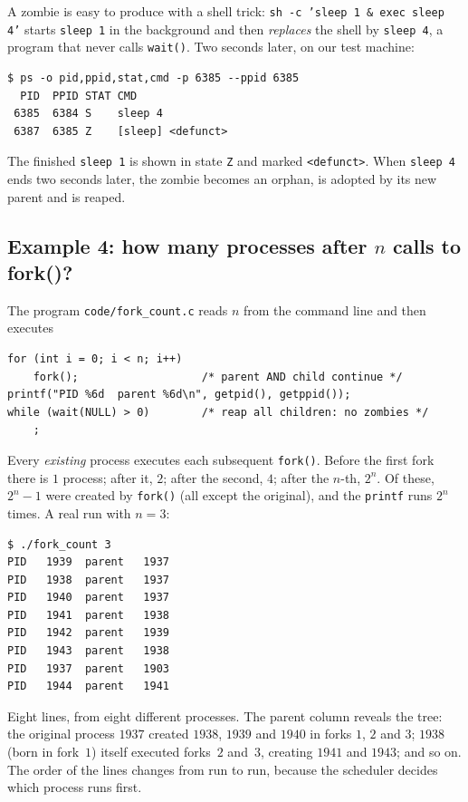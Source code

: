 \documentclass[11pt,a4paper]{article}
\newcommand{\cmd}[1]{\texttt{#1}}
\begin{document}
A zombie is easy to produce with a shell trick: \cmd{sh -c 'sleep 1 \& exec sleep 4'} starts \cmd{sleep 1} in the background and then \emph{replaces} the shell by \cmd{sleep 4}, a program that never calls \cmd{wait()}. Two seconds later, on our test machine:

\begin{lstlisting}[style=term]
$ ps -o pid,ppid,stat,cmd -p 6385 --ppid 6385
  PID  PPID STAT CMD
 6385  6384 S    sleep 4
 6387  6385 Z    [sleep] <defunct>
\end{lstlisting}

The finished \cmd{sleep 1} is shown in state \texttt{Z} and marked \texttt{<defunct>}. When \cmd{sleep 4} ends two seconds later, the zombie becomes an orphan, is adopted by its new parent and is reaped.

\subsection{Example 4: how many processes after $n$ calls to fork()?}

The program \texttt{code/fork\_count.c} reads $n$ from the command line and then executes
\begin{lstlisting}
for (int i = 0; i < n; i++)
    fork();                   /* parent AND child continue */
printf("PID %6d  parent %6d\n", getpid(), getppid());
while (wait(NULL) > 0)        /* reap all children: no zombies */
    ;
\end{lstlisting}

Every \emph{existing} process executes each subsequent \cmd{fork()}. Before the first fork there is $1$ process; after it, $2$; after the second, $4$; after the $n$-th, $2^{n}$. Of these, $2^{n} - 1$ were created by \cmd{fork()} (all except the original), and the \cmd{printf} runs $2^{n}$ times. A real run with $n = 3$:

\begin{lstlisting}[style=term]
$ ./fork_count 3
PID   1939  parent   1937
PID   1938  parent   1937
PID   1940  parent   1937
PID   1941  parent   1938
PID   1942  parent   1939
PID   1943  parent   1938
PID   1937  parent   1903
PID   1944  parent   1941
\end{lstlisting}

Eight lines, from eight different processes. The parent column reveals the tree: the original process $1937$ created $1938$, $1939$ and $1940$ in forks $1$, $2$ and $3$; $1938$ (born in fork~$1$) itself executed forks~$2$ and~$3$, creating $1941$ and $1943$; and so on. The order of the lines changes from run to run, because the scheduler decides which process runs first.
\end{document}
